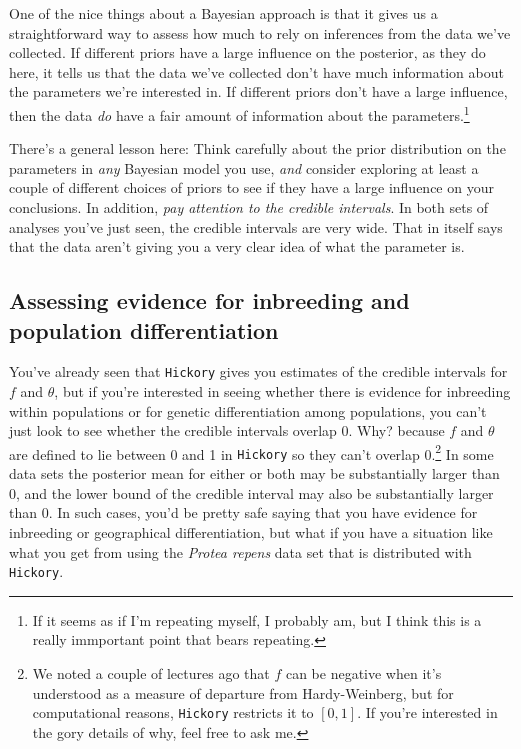 \documentclass[12pt]{article}
\begin{document}
One of the nice things about a Bayesian approach is that it gives us a
straightforward way to assess how much to rely on inferences from the
data we've collected. If different priors have a large influence on
the posterior, as they do here, it tells us that the data we've
collected don't have much information about the parameters we're
interested in. If different priors don't have a large influence, then
the data {\it do\/} have a fair amount of information about the
parameters.\footnote{If it seems as if I'm repeating myself, I
  probably am, but I think this is a really immportant point that
  bears repeating.} 

There's a general lesson here: Think carefully about the prior
distribution on the parameters in {\it any\/} Bayesian model you use,
{\it and\/} consider exploring at least a couple of different choices
of priors to see if they have a large influence on your
conclusions. In addition, {\it pay attention to the credible
  intervals}. In both sets of analyses you've just seen, the credible
intervals are very wide. That in itself says that the data aren't
giving you a very clear idea of what the parameter is.

\subsection*{Assessing evidence for inbreeding and population
  differentiation}

You've already seen that {\tt Hickory} gives you estimates of the
credible intervals for $f$ and $\theta$, but if you're interested in
seeing whether there is evidence for inbreeding within populations or
for genetic differentiation among populations, you can't just look to
see whether the credible intervals overlap $0$. Why? because $f$ and
$\theta$ are defined to lie between 0 and 1 in {\tt Hickory} so they
can't overlap 0.\footnote{We noted a couple of lectures ago that $f$
  can be negative when it's understood as a measure of departure from
  Hardy-Weinberg, but for computational reasons, {\tt Hickory}
  restricts it to $[0,1]$. If you're interested in the gory details of
  why, feel free to ask me.} In some data sets the posterior mean for
either or both may be substantially larger than 0, and the lower bound
of the credible interval may also be substantially larger than 0. In
such cases, you'd be pretty safe saying that you have evidence for
inbreeding or geographical differentiation, but what if you have a
situation like what you get from using the {\it Protea repens\/} data
set that is distributed with {\tt Hickory}.
\end{document}
